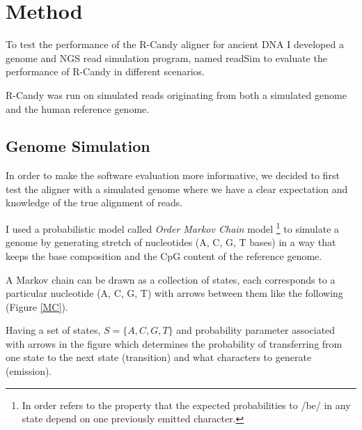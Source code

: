 \documentclass[11pt,a4paper]{report}
\begin{document}


\section{Method} \label{Method}

To test the performance of the R-Candy aligner for ancient DNA I developed a 
genome and NGS read simulation program, named readSim to evaluate the performance 
of R-Candy in different scenarios.

R-Candy was run on simulated reads originating from both a simulated genome and 
the human reference genome.
 


\subsection{Genome Simulation} 
\label{ Genome Simulation }


In order to make the software evaluation more informative, we decided to first 
test the aligner with a simulated genome where we have a clear expectation and
 knowledge of the true alignment of reads.

I used a probabilistic model called \emph{ Order Markov Chain} model 
\footnote{In  order refers to the property that the expected probabilities 
to /be/ in any state depend on one previously emitted character.} to simulate 
a genome by generating stretch of nucleotides (A, C, G, T bases) in a way that  
keeps the base composition and the CpG content of the reference genome.

A Markov chain can be drawn as a collection of states, each corresponds to a 
particular nucleotide (A, C, G, T) with arrows between them like the following 
(Figure \ref{MC}). 

Having a set of states,  $ S= \{ A, C,  G, T \}$  and probability parameter 
associated with arrows in the figure which determines the probability of 
transferring from one state to the next state (transition) and what characters 
to generate (emission).
\end{document}
